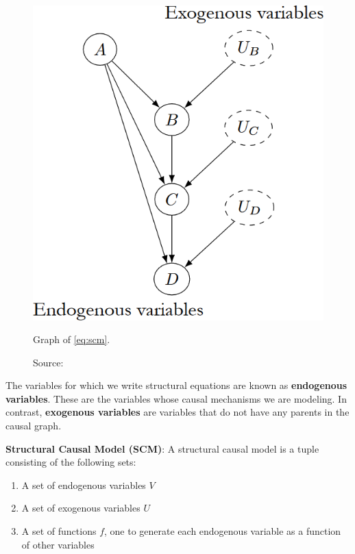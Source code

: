 \begin{figure}[H]
    \centering
    \includegraphics[width=.45\textwidth]{figures/ch3/24.scm.png}
    \caption{Graph of \ref{eq:scm}.}
    \vspace{-10px}
    \caption*{\scriptsize{Source: \cite{Neal_2020a}}}
    \label{fig:scm}
\end{figure}

The variables for which we write structural equations are known as
\textbf{endogenous variables}. These are the variables whose causal
mechanisms we are modeling.
In contrast, \textbf{exogenous variables} are variables that
do not have any parents in the causal graph.

\textbf{Structural Causal Model (SCM)}: A structural causal model
is a tuple consisting of the following sets:
\begin{enumerate}
    \item A set of endogenous variables \( V \)
    \item A set of exogenous variables \( U \)
    \item A set of functions \( f \), one to generate each
    endogenous variable as a function of other variables
\end{enumerate}